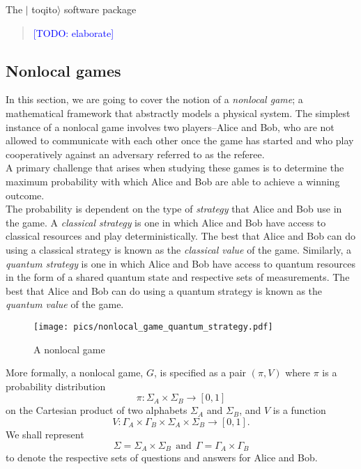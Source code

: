 \documentclass[nofootinbib,superscriptaddress,a4paper,twocolumn,longbibliography,floatfix,pra]{revtex4-2}
\newcommand{\comment}[1]{\begin{quote}\sf 
    \textcolor{blue}{[#1]}\end{quote}}
\newcommand{\toqitofont}{%
	\fontfamily{FiraSans}%
	\selectfont}
\newcommand{\toqito}{ $|${\toqitofont toqito}$\rangle$\xspace}
\begin{document}
The \toqito software package \comment{TODO: elaborate}

\subsection{Nonlocal games}\label{sec:nonlocal_games}

In this section, we are going to cover the notion of a \emph{nonlocal game}; a
mathematical framework that abstractly models a physical system. The simplest
instance of a nonlocal game involves two players--Alice and Bob, who are not
allowed to communicate with each other once the game has started and who play
cooperatively against an adversary referred to as the referee. \\

A primary challenge that arises when studying these games is to determine the
maximum probability with which Alice and Bob are able to achieve a winning
outcome. \\

The probability is dependent on the type of \emph{strategy} that Alice and Bob
use in the game. A \emph{classical strategy} is one in which Alice and Bob have
access to classical resources and play deterministically. The best that Alice
and Bob can do using a classical strategy is known as the \emph{classical
value} of the game.  Similarly, a \emph{quantum strategy} is one in which Alice
and Bob have access to quantum resources in the form of a shared quantum state
and respective sets of measurements. The best that Alice and Bob can do using a
quantum strategy is known as the \emph{quantum value} of the game.
\\

\begin{figure}[!htpb]
    \centering
    \texttt{[image: pics/nonlocal\_game\_quantum\_strategy.pdf]}
    \caption{A nonlocal game}
    \label{fig:nonlocal_game}
\end{figure}

More formally, a nonlocal game, $G$, is specified as a pair $(\pi, V)$ where
$\pi$ is a probability distribution
\begin{equation}
    \pi : \Sigma_A \times \Sigma_B \rightarrow [0,1]
\end{equation}
on the Cartesian product of two alphabets $\Sigma_A$ and $\Sigma_B$, and $V$ is
a function
\begin{equation}
    V : \Gamma_A \times \Gamma_B \times \Sigma_A \times \Sigma_B \rightarrow [0,1].
\end{equation}
We shall represent
\begin{equation}
    \Sigma = \Sigma_A \times \Sigma_B 
    \ \ \text{and} \ \ 
    \Gamma = \Gamma_A \times \Gamma_B
\end{equation}
to denote the respective sets of questions and answers for Alice and Bob.
\end{document}
